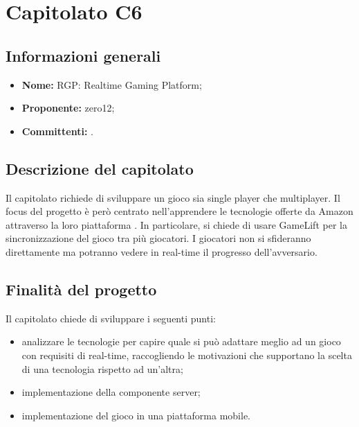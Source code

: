 \section{Capitolato C6}

\subsection{Informazioni generali}
\begin{itemize}
\item \textbf{Nome:} RGP: Realtime Gaming Platform;
\item \textbf{Proponente:} zero12;
\item \textbf{Committenti:} \committenti{}.
\end{itemize}

\subsection{Descrizione del capitolato}
Il capitolato richiede di sviluppare un gioco sia single player che multiplayer.
Il focus del progetto è però centrato nell'apprendere le tecnologie offerte da Amazon attraverso la loro piattaforma .
In particolare, si chiede di usare  GameLift per la sincronizzazione del gioco tra più giocatori.
I giocatori non si sfideranno direttamente ma potranno vedere in real-time il progresso dell'avversario.

\subsection{Finalità del progetto}
Il capitolato chiede di sviluppare i seguenti punti:
\begin{itemize}
\item analizzare le tecnologie  per capire quale si può adattare meglio ad un gioco con requisiti di real-time, raccogliendo le motivazioni che supportano la scelta di una tecnologia rispetto ad un'altra;
\item implementazione della componente server;
\item implementazione del gioco in una piattaforma mobile.
\end{itemize}

